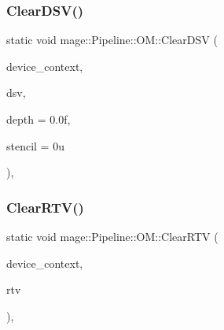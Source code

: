 \hypertarget{structmage_1_1_pipeline_1_1_o_m_a1bc0e5e35336a2ad07bf0a5d58944788}{}\label{structmage_1_1_pipeline_1_1_o_m_a1bc0e5e35336a2ad07bf0a5d58944788} 
\subsubsection{\texorpdfstring{Clear\+D\+S\+V()}{ClearDSV()}}
{\footnotesize\ttfamily static void mage\+::\+Pipeline\+::\+O\+M\+::\+Clear\+D\+SV (\begin{DoxyParamCaption}\item[{I\+D3\+D11\+Device\+Context2 $\ast$}]{device\+\_\+context,  }\item[{I\+D3\+D11\+Depth\+Stencil\+View $\ast$}]{dsv,  }\item[{\hyperlink{namespacemage_aa97e833b45f06d60a0a9c4fc22ae02c0}{F32}}]{depth = {\ttfamily 0.0f},  }\item[{\hyperlink{namespacemage_afc638980bc6154f15af5e2d93a0e0ea9}{U8}}]{stencil = {\ttfamily 0u} }\end{DoxyParamCaption})\hspace{0.3cm}{\ttfamily [static]}, {\ttfamily [noexcept]}}

\hypertarget{structmage_1_1_pipeline_1_1_o_m_a0a40eb7a844d2861e74582879afec962}{}\label{structmage_1_1_pipeline_1_1_o_m_a0a40eb7a844d2861e74582879afec962} 
\subsubsection{\texorpdfstring{Clear\+R\+T\+V()}{ClearRTV()}\hspace{0.1cm}{\footnotesize\ttfamily [1/2]}}
{\footnotesize\ttfamily static void mage\+::\+Pipeline\+::\+O\+M\+::\+Clear\+R\+TV (\begin{DoxyParamCaption}\item[{I\+D3\+D11\+Device\+Context2 $\ast$}]{device\+\_\+context,  }\item[{I\+D3\+D11\+Render\+Target\+View $\ast$}]{rtv }\end{DoxyParamCaption})\hspace{0.3cm}{\ttfamily [static]}, {\ttfamily [noexcept]}}

\hypertarget{structmage_1_1_pipeline_1_1_o_m_a0e83357b9289a95ecedc6c940c26d957}{}\label{structmage_1_1_pipeline_1_1_o_m_a0e83357b9289a95ecedc6c940c26d957} 
